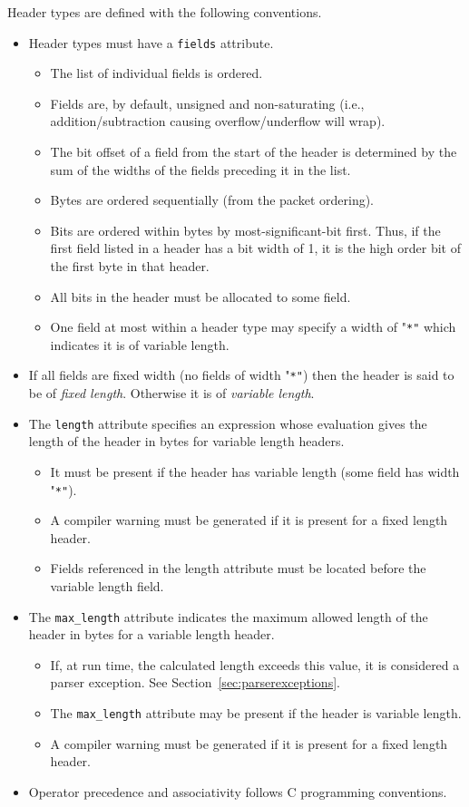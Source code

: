 \documentclass[12pt]{article}
\begin{document}
Header types are defined with the following conventions.
\begin{itemize}
\item
Header types must have a \texttt{fields} attribute.
\begin{itemize}
\item
The list of individual fields is ordered.
\item
Fields are, by default, unsigned and non-saturating (i.e., addition/subtraction
causing overflow/underflow will wrap).
\item
The bit offset of a field from the start of the header is determined by the
sum of the widths of the fields preceding it in the list.
\item
Bytes are ordered sequentially (from the packet ordering).
\item
Bits are ordered within bytes by most-significant-bit first.  Thus, if the
first field listed in a header has a bit width of 1, it is the high order
bit of the first byte in that header.
\item
All bits in the header must be allocated to some field.
\item
One field at most within a header type may specify a width of "\texttt{*"} which indicates
it is of variable length.
\end{itemize}

\item
If all fields are fixed width (no fields of width "\texttt{*"}) then the header is
said to be of \textit{fixed length}. Otherwise it is of \textit{variable length}.
\item
The \texttt{length} attribute specifies an expression whose evaluation gives the length
of the header in bytes for variable length headers.
\begin{itemize}
\item
It must be present if the header has variable length (some field has width
"\texttt{*"}).
\item
A compiler warning must be generated if it is present for a fixed length header.
\item
Fields referenced in the length attribute must be located before the variable
length field.
\end{itemize}

\item
The \texttt{max_length} attribute indicates the maximum allowed length of the header
in bytes for a variable length header.
\begin{itemize}
\item
If, at run time, the calculated length exceeds this value, it is considered
a parser exception. See Section~\ref{sec:parserexceptions}.
\item
The \texttt{max_length} attribute may be present if the header is variable length.

\item
A compiler warning must be generated if it is present for a fixed length header.
\end{itemize}

\item
Operator precedence and associativity follows C programming conventions.
\end{itemize}
\end{document}
